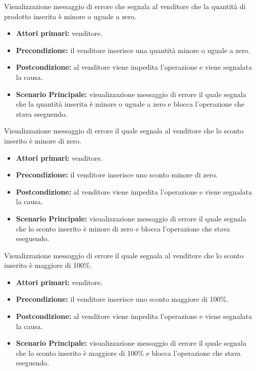 Visualizzazione messaggio di errore che segnala al venditore che la quantità di prodotto inserita è minore o uguale a zero.
\begin{itemize}
    \item \textbf{Attori primari:} venditore.
    \item \textbf{Precondizione:} il venditore inserisce una quantità minore o uguale a zero.
    \item \textbf{Postcondizione:} al venditore viene impedita l'operazione e viene segnalata la causa.
    \item \textbf{Scenario Principale:} visualizzazione messaggio di errore il quale segnala che la quantità inserita è minore o uguale a zero e blocca l'operazione che stava eseguendo.
\end{itemize}

Visualizzazione messaggio di errore il quale segnala al venditore che lo sconto inserito è minore di zero.
\begin{itemize}
    \item \textbf{Attori primari:} venditore.
    \item \textbf{Precondizione:} il venditore inserisce uno sconto minore di zero.
    \item \textbf{Postcondizione:} al venditore viene impedita l'operazione e viene segnalata la causa.
    \item \textbf{Scenario Principale:} visualizzazione messaggio di errore il quale segnala che lo sconto inserito è minore di zero e blocca l'operazione che stava eseguendo.
\end{itemize}

Visualizzazione messaggio di errore il quale segnala al venditore che lo sconto inserito è maggiore di 100\%.
\begin{itemize}
    \item \textbf{Attori primari:} venditore.
    \item \textbf{Precondizione:} il venditore inserisce uno sconto maggiore di 100\%.
    \item \textbf{Postcondizione:} al venditore viene impedita l'operazione e viene segnalata la causa.
    \item \textbf{Scenario Principale:} visualizzazione messaggio di errore il quale segnala che lo sconto inserito è maggiore di 100\% e blocca l'operazione che stava eseguendo.
\end{itemize}

